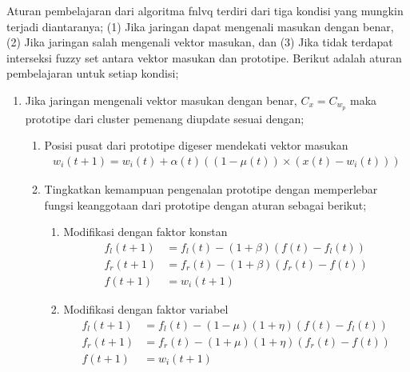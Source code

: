 Aturan pembelajaran dari algoritma \gls{fnlvq} terdiri dari tiga kondisi yang
mungkin terjadi diantaranya; (1) Jika jaringan dapat mengenali masukan dengan
benar, (2) Jika jaringan salah mengenali vektor masukan, dan (3) Jika tidak
terdapat interseksi fuzzy set antara vektor masukan dan prototipe. Berikut
adalah aturan pembelajaran untuk setiap kondisi;
\begin{enumerate}
  \setlength{\itemsep}{1pt}
  \setlength{\parskip}{0pt}
  \setlength{\parsep}{0pt}
  \item Jika jaringan mengenali vektor masukan dengan benar, $C_x = C_{w_p}$
  maka prototipe dari cluster pemenang diupdate sesuai dengan;
  \begin{enumerate}
  	\item Posisi pusat dari prototipe digeser mendekati vektor masukan
  	\begin{align}
  	w_i(t+1) = w_i(t) + \alpha(t) \left((1-\mu(t))\times(x(t) - w_i(t))  \right)
  	\end{align}
  	\item Tingkatkan kemampuan pengenalan prototipe  dengan memperlebar fungsi
  	keanggotaan dari prototipe dengan aturan sebagai berikut;
  	\begin{enumerate}
  	  \item Modifikasi dengan faktor konstan
  	  \begin{align}
  	  f_l(t+1) &= f_l(t) - (1+\beta) (f(t) - f_l(t)) \nonumber \\
  	  f_r(t+1) &= f_r(t) - (1+\beta) (f_r(t) - f(t)) \nonumber \\
  	  f(t+1)   &= w_i(t+1) 
  	  \end{align}
  	  
  	  \item Modifikasi dengan faktor variabel
	  \begin{align}
  	  f_l(t+1) &= f_l(t) - (1 - \mu)(1+\eta)(f(t) - f_l(t)) \nonumber \\
  	  f_r(t+1) &= f_r(t) - (1 + \mu)(1+\eta)(f_r(t) - f(t)) \nonumber \\
  	  f(t+1)   &= w_i(t+1)
  	  \end{align}  	  
  	\end{enumerate}
  \end{enumerate}
  

\end{enumerate}
